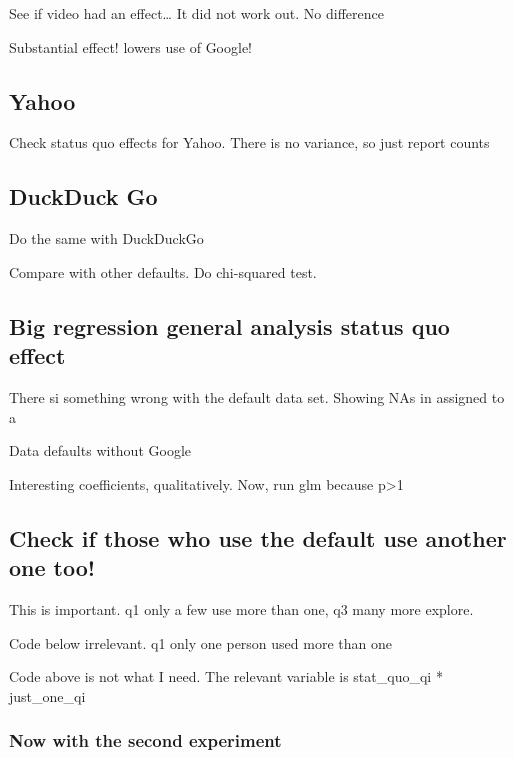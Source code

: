 \documentclass[
  11pt,
]{article}
\begin{document}
See if video had an effect\ldots{} It did not work out. No difference

Substantial effect! lowers use of Google!

\hypertarget{yahoo}{%
\subsection{Yahoo}\label{yahoo}}

Check status quo effects for Yahoo. There is no variance, so just report counts

\hypertarget{duckduck-go}{%
\subsection{DuckDuck Go}\label{duckduck-go}}

Do the same with DuckDuckGo

Compare with other defaults. Do chi-squared test.

\hypertarget{big-regression-general-analysis-status-quo-effect}{%
\subsection{Big regression general analysis status quo effect}\label{big-regression-general-analysis-status-quo-effect}}

There si something wrong with the default data set. Showing NAs in assigned to a

Data defaults without Google

Interesting coefficients, qualitatively. Now, run glm because p\textgreater1

\hypertarget{check-if-those-who-use-the-default-use-another-one-too}{%
\subsection{Check if those who use the default use another one too!}\label{check-if-those-who-use-the-default-use-another-one-too}}

This is important. q1 only a few use more than one, q3 many more explore.

Code below irrelevant. q1 only one person used more than one

Code above is not what I need. The relevant variable is stat\_quo\_qi * just\_one\_qi

\hypertarget{now-with-the-second-experiment}{%
\subsubsection{Now with the second experiment}\label{now-with-the-second-experiment}}
\end{document}
